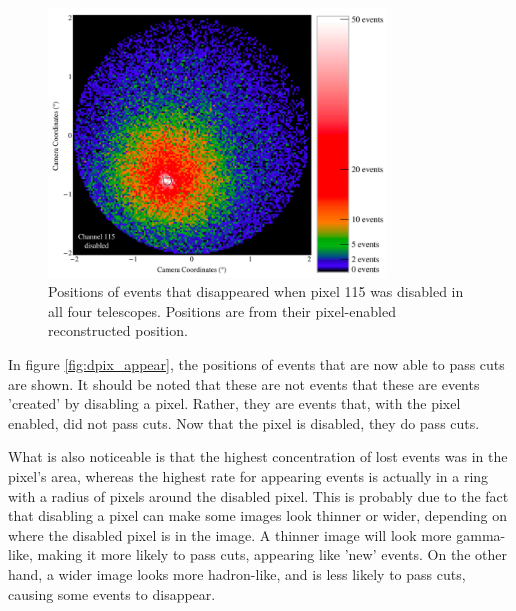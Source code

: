 \begin{figure}[ht]
  \begin{center}
    \includegraphics[width=0.8\textwidth]{images/disabled_pixel/disappearing_events}
    \caption[Disappering Events]{Positions of events that disappeared when pixel 115 was disabled in all four telescopes.  Positions are from their pixel-enabled reconstructed position.}\label{fig:dpix_disappear}
  \end{center}
\end{figure}

In figure \ref{fig:dpix_appear}, the positions of events that are now able to pass cuts are shown.
It should be noted that these are not events that these are events 'created' by disabling a pixel.
Rather, they are events that, with the pixel enabled, did not pass cuts.
Now that the pixel is disabled, they do pass cuts.

What is also noticeable is that the highest concentration of lost events was in the pixel's area, whereas the highest rate for appearing events is actually in a ring with a radius of  pixels around the disabled pixel.
This is probably due to the fact that disabling a pixel can make some images look thinner or wider, depending on where the disabled pixel is in the image.
A thinner image will look more gamma-like, making it more likely to pass cuts, appearing like 'new' events.
On the other hand, a wider image looks more hadron-like, and is less likely to pass cuts, causing some events to disappear.

